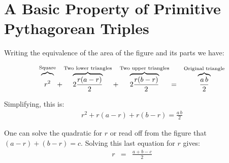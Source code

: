 \documentclass[12pt]{article}
\begin{document}
\section{A Basic Property of Primitive Pythagorean Triples}
Writing the equivalence of the area of the figure and its parts we have:

\begin{eqnarray}
    \overbrace{\vphantom{\frac{X^1}{X}}r^2}^{\text{Square}} 
    + \overbrace{2 \frac{r(a - r)}{2}}^{\text{Two lower triangles}} 
    + \overbrace{2 \frac{r(b-r)}{2}}^{\text{Two upper triangles}}  
    &=& \overbrace{\frac{a\, b}{2}}^{\text{Original triangle}}  
\end{eqnarray}

Simplifying, this is:
\begin{eqnarray}
r^2 + r(a - r) + r(b-r) = \frac{a\, b}{2} \label{area} 
\end{eqnarray}

One can solve the quadratic for $r$ or read off from the figure 
that $(a-r) + (b-r) = c$. Solving this last equation for $r$ gives:
\begin{eqnarray}
  r & = & \frac{a + b - c}{2} \label{radius}
\end{eqnarray}
\end{document}
